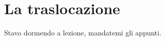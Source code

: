 \documentclass[preview]{standalone}
\begin{document}
\genpage

\section{La traslocazione}

\begin{plainhtml}
    Stavo dormendo a lezione, mandatemi gli appunti.
\end{plainhtml}
\end{document}
